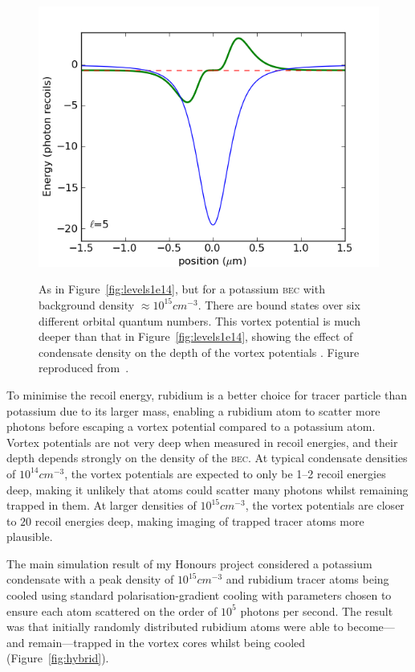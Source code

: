 \begin{figure}
{\includegraphics[width=0.5\columnwidth]{figures/velocimetry/levels1e15_l=05}}
\noindent{}
\caption{As in Figure~\ref{fig:levels1e14}, but for a potassium \textsc{bec} with background density ${\approx 10^{15}\unit{cm}^{-3}}$. There are bound states over six different orbital quantum numbers. This vortex potential is much deeper than that in Figure~\ref{fig:levels1e14}, showing the effect of condensate density on the depth of the vortex potentials . Figure reproduced from~\cite{billington_particle_2010}.}%
\label{fig:levels1e15}%
\end{figure}

To minimise the recoil energy, rubidium is a better choice for tracer particle than potassium due to its larger mass, enabling a rubidium atom to scatter more photons before escaping a vortex potential compared to a potassium atom. Vortex potentials are not very deep when measured in recoil energies, and their depth depends strongly on the density of the \textsc{bec}. At typical condensate densities of $10^{14}\unit{cm}^{-3}$, the vortex potentials are expected to only be 1--2 recoil energies deep, making it unlikely that atoms could scatter many photons whilst remaining trapped in them. At larger densities of $10^{15}\unit{cm}^{-3}$, the vortex potentials are closer to $20$ recoil energies deep, making imaging of trapped tracer atoms more plausible.

The main simulation result of my Honours project considered a potassium condensate with a peak density of $10^{15}\unit{cm}^{-3}$ and rubidium tracer atoms being cooled using standard polarisation-gradient cooling with parameters chosen to ensure each atom scattered on the order of $10^5$ photons per second. The result was that initially randomly distributed rubidium atoms were able to become---and remain---trapped in the vortex cores whilst being cooled (Figure~\ref{fig:hybrid}).

